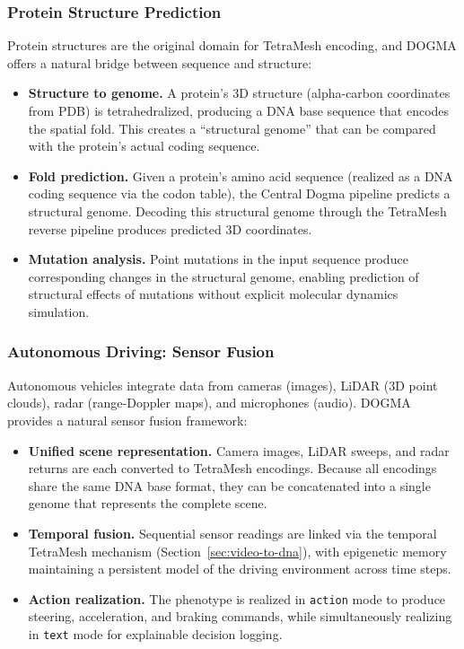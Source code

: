 \subsubsection{Protein Structure Prediction}

Protein structures are the original domain for TetraMesh encoding, and DOGMA offers a natural bridge between sequence and structure:

\begin{itemize}[leftmargin=1.5em]
  \item \textbf{Structure to genome.} A protein's 3D structure (alpha-carbon coordinates from PDB) is tetrahedralized, producing a DNA base sequence that encodes the spatial fold. This creates a ``structural genome'' that can be compared with the protein's actual coding sequence.
  \item \textbf{Fold prediction.} Given a protein's amino acid sequence (realized as a DNA coding sequence via the codon table), the Central Dogma pipeline predicts a structural genome. Decoding this structural genome through the TetraMesh reverse pipeline produces predicted 3D coordinates.
  \item \textbf{Mutation analysis.} Point mutations in the input sequence produce corresponding changes in the structural genome, enabling prediction of structural effects of mutations without explicit molecular dynamics simulation.
\end{itemize}

\subsubsection{Autonomous Driving: Sensor Fusion}

Autonomous vehicles integrate data from cameras (images), LiDAR (3D point clouds), radar (range-Doppler maps), and microphones (audio). DOGMA provides a natural sensor fusion framework:

\begin{itemize}[leftmargin=1.5em]
  \item \textbf{Unified scene representation.} Camera images, LiDAR sweeps, and radar returns are each converted to TetraMesh encodings. Because all encodings share the same DNA base format, they can be concatenated into a single genome that represents the complete scene.
  \item \textbf{Temporal fusion.} Sequential sensor readings are linked via the temporal TetraMesh mechanism (Section~\ref{sec:video-to-dna}), with epigenetic memory maintaining a persistent model of the driving environment across time steps.
  \item \textbf{Action realization.} The phenotype is realized in \texttt{action} mode to produce steering, acceleration, and braking commands, while simultaneously realizing in \texttt{text} mode for explainable decision logging.
\end{itemize}


